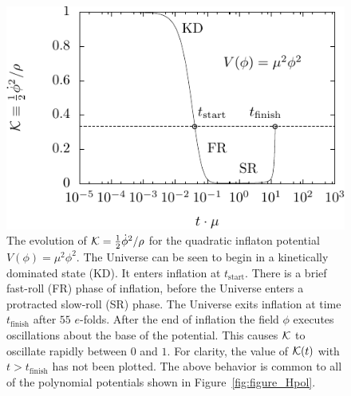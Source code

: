%
\begin{figure}[tp]
  \includegraphics[width=\textwidth]{chapters/kinetic_dominance/figures/Kpol} 
  \caption{The evolution of $\mathcal{K} = \frac{1}{2}\dot{\phi}^2/\rho$ for the quadratic inflaton potential $V(\phi) = \mu^2 \phi^2$.  The Universe can be seen to begin in a kinetically dominated state (KD).  It enters inflation at $t_\mathrm{start}$. There is a brief fast-roll (FR) phase of inflation, before the Universe enters a protracted slow-roll (SR) phase. The Universe exits inflation at time $t_\mathrm{finish}$ after $55$ $e$-folds. After the end of inflation the field $\phi$ executes oscillations about the base of the potential. This causes $\mathcal{K}$ to oscillate rapidly between $0$ and $1$. For clarity, the value of $\mathcal{K}(t)$ with $t>t_\mathrm{finish}$ has not been plotted. The above behavior is common to all of the  polynomial potentials shown in Figure~\protect\ref{fig:figure_Hpol}.\label{fig:figure_Kpol}  }
\end{figure}
%

